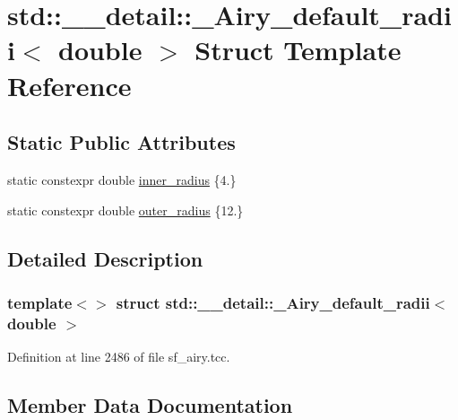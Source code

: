 \hypertarget{structstd_1_1____detail_1_1__Airy__default__radii_3_01double_01_4}{}\section{std\+:\+:\+\_\+\+\_\+detail\+:\+:\+\_\+\+Airy\+\_\+default\+\_\+radii$<$ double $>$ Struct Template Reference}
\label{structstd_1_1____detail_1_1__Airy__default__radii_3_01double_01_4}
\subsection*{Static Public Attributes}
\begin{DoxyCompactItemize}
\item 
static constexpr double \hyperlink{structstd_1_1____detail_1_1__Airy__default__radii_3_01double_01_4_a1c16ae812de7fce0a39bc3b094767b87}{inner\+\_\+radius} \{4.\}
\item 
static constexpr double \hyperlink{structstd_1_1____detail_1_1__Airy__default__radii_3_01double_01_4_a0d0c981d84c034afb18aa533bd6a9a52}{outer\+\_\+radius} \{12.\}
\end{DoxyCompactItemize}


\subsection{Detailed Description}
\subsubsection*{template$<$$>$\newline
struct std\+::\+\_\+\+\_\+detail\+::\+\_\+\+Airy\+\_\+default\+\_\+radii$<$ double $>$}



Definition at line 2486 of file sf\+\_\+airy.\+tcc.



\subsection{Member Data Documentation}
\mbox{\label{structstd_1_1____detail_1_1__Airy__default__radii_3_01double_01_4_a1c16ae812de7fce0a39bc3b094767b87}} 
